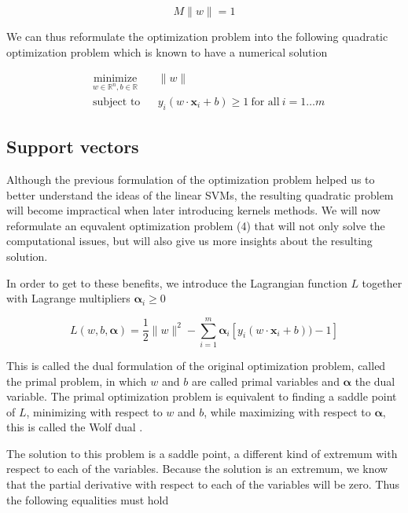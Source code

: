 \begin{equation*}
  M\|w\| = 1
\end{equation*}
  
We can thus reformulate the optimization problem into the following quadratic optimization problem which is known to have a numerical solution

\begin{equation}
  \begin{aligned}
    &\underset{w \in \mathbb{R}^n, b \in \mathbb{R}} {\text{minimize}}
    & &\|w\|\\
    &\text{subject to}
    & &y_i(w \cdot \mathbf{x}_i + b) \ge 1\ \text{for all}\ i = 1 \dotsc m
  \end{aligned}
\end{equation}

\subsection {Support vectors}

Although the previous formulation of the optimization problem helped us to better understand the ideas of the linear SVMs, the resulting quadratic problem will become impractical when later introducing kernels methods. We will now reformulate an equvalent optimization problem (4) that will not only solve the computational issues, but will also give us more insights about the resulting solution.

In order to get to these benefits, we introduce the Lagrangian function $L$ together with Lagrange multipliers $\boldsymbol{\alpha}_i \ge 0$

\begin{equation}
  L(w, b, \boldsymbol{\alpha}) = \frac{1}{2}\|w\|^2 - \sum^m_{i=1} \boldsymbol{\alpha}_i[y_i(w \cdot \mathbf{x}_i + b)) - 1]
\end{equation}

This is called the dual formulation of the original optimization problem, called the primal problem, in which $w$ and $b$ are called primal variables and $\boldsymbol{\alpha}$ the dual variable. The primal optimization problem is equivalent to finding a saddle point of $L$, minimizing with respect to $w$ and $b$, while maximizing with respect to $\boldsymbol{\alpha}$, this is called the Wolf dual \cite{Fletcher:1987:PMO:39857}.

The solution to this problem is a saddle point, a different kind of extremum with respect to each of the variables. Because the solution is an extremum, we know that the partial derivative with respect to each of the variables will be zero. Thus the following equalities must hold

